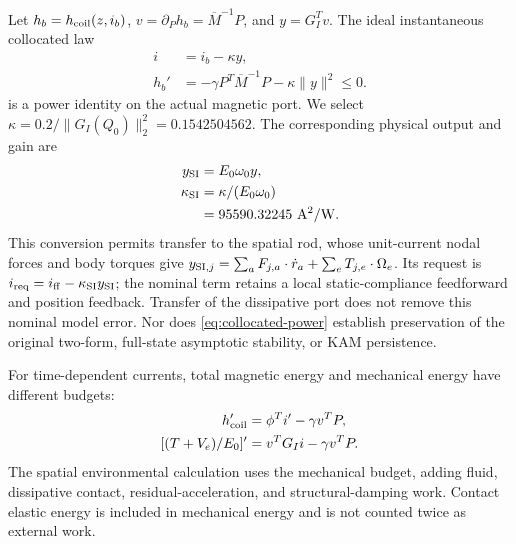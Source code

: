 Let $h_b=h_{\rm coil}(z,i_b)$, $v=\partial_Ph_b=\overline M^{-1}P$, and $y=G_I^Tv$. The ideal instantaneous collocated law
\begin{equation}
\begin{aligned}
 i&=i_b-\kappa y,\\
 h_b'&=-\gamma P^T\overline M^{-1}P-\kappa\|y\|^2\leq0.
\end{aligned}
 \label{eq:collocated-power}
\end{equation}
is a power identity on the actual magnetic port. We select $\kappa=0.2/\|G_I(Q_0)\|_2^2=0.1542504562$. The corresponding physical output and gain are
\begin{equation}
\begin{aligned}
 y_{\rm SI}&=E_0\omega_0y,\\
 \kappa_{\rm SI}&=\kappa/(E_0\omega_0)\\
 &=95590.32245\ {\rm A^2/W}.
\end{aligned}
 \label{eq:port-units}
\end{equation}
This conversion permits transfer to the spatial rod, whose unit-current nodal forces and body torques give
$y_{{\rm SI},j}=\sum_aF_{j,a}\cdot\dot r_a+\sum_eT_{j,e}\cdot\Omega_e$.
Its request is $i_{\rm req}=i_{\rm ff}-\kappa_{\rm SI}y_{\rm SI}$; the nominal term retains a local static-compliance feedforward and position feedback. Transfer of the dissipative port does not remove this nominal model error. Nor does \eqref{eq:collocated-power} establish preservation of the original two-form, full-state asymptotic stability, or KAM persistence.

For time-dependent currents, total magnetic energy and mechanical energy have different budgets:
\begin{align}
 h_{\rm coil}'&=\phi^Ti'-\gamma v^TP,\label{eq:total-power}\\
 [(T+V_e)/E_0]'&=v^TG_Ii-\gamma v^TP.
 \label{eq:mechanical-power}
\end{align}
The spatial environmental calculation uses the mechanical budget, adding fluid, dissipative contact, residual-acceleration, and structural-damping work. Contact elastic energy is included in mechanical energy and is not counted twice as external work.

